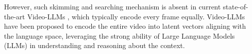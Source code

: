 However, such skimming and searching mechanism is absent in current state-of-the-art Video-LLMs \citep{chen2023video-LLMmodelingvideosequence, 2023videochat, Xu2024PLLaVAP, maaz-etal-2024-video, li2024mvbenchcomprehensivemultimodalvideo, Ma_2024_CVPR}, which typically encode every frame equally. 
Video-LLMs have been proposed to encode the entire video into latent vectors aligning with the language space, 
leveraging the strong ability of Large Language Models (LLMs) in understanding and reasoning about the context. 
